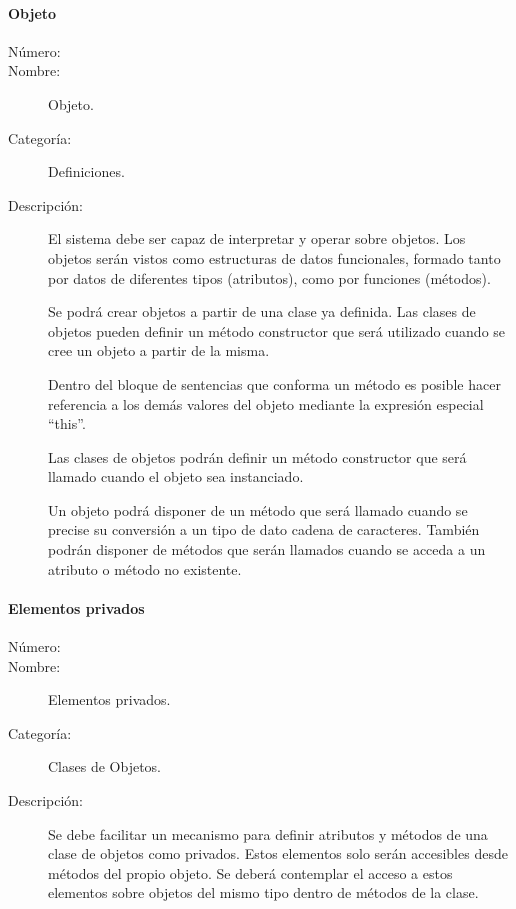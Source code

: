 \paragraph{Objeto}
\begin{framed}
	\begin{description}
		\item [Número:] \cn
		\item [Nombre:] Objeto.
		\item [Categoría:] Definiciones.
		\item [Descripción:] El sistema debe ser capaz de interpretar y operar sobre objetos. Los objetos serán vistos
		como estructuras de datos funcionales, formado tanto por datos de diferentes tipos (atributos), como por funciones (métodos). 
      
      Se podrá crear objetos a partir de una clase ya definida. Las clases de objetos pueden definir un método constructor que será utilizado cuando se cree un objeto a partir de la misma. 
      
      Dentro del bloque de sentencias que conforma un método es posible hacer referencia a los demás valores del objeto mediante 
      la expresión especial ``this''.
      
      Las clases de objetos podrán definir un método constructor que será llamado cuando el objeto sea instanciado. 
      
      Un objeto podrá disponer de un método que será llamado cuando se precise su conversión a un tipo de dato cadena de caracteres. También podrán disponer de métodos que serán llamados cuando
se acceda a un atributo o método no existente.
	\end {description}
\end{framed}

\paragraph{Elementos privados}
\begin{framed}
	\begin{description}
		\item [Número:] \cn
		\item [Nombre:] Elementos privados.
		\item [Categoría:] Clases de Objetos.
		\item [Descripción:] Se debe facilitar un mecanismo para definir atributos y métodos de una clase de objetos como privados. 
      Estos elementos solo serán accesibles desde métodos del propio objeto. Se deberá contemplar el acceso a estos elementos
      sobre objetos del mismo tipo dentro de métodos de la clase.
	\end{description}
\end{framed}

